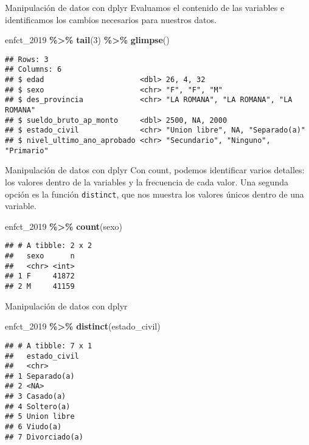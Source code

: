 \documentclass[
  ignorenonframetext,
]{beamer}
\newenvironment{Shaded}{\begin{snugshade}}{\end{snugshade}}
\newcommand{\DecValTok}[1]{\textcolor[rgb]{0.00,0.00,0.81}{#1}}
\newcommand{\FunctionTok}[1]{\textcolor[rgb]{0.13,0.29,0.53}{\textbf{#1}}}
\newcommand{\NormalTok}[1]{#1}
\newcommand{\SpecialCharTok}[1]{\textcolor[rgb]{0.81,0.36,0.00}{\textbf{#1}}}
\begin{document}
\begin{frame}[fragile]{Manipulación de datos con dplyr}
\label{manipulaciuxf3n-de-datos-con-dplyr-4}
Evaluamos el contenido de las variables e identificamos los cambios
necesarios para nuestros datos.

\begin{Shaded}
\begin{Highlighting}[]
\NormalTok{enfct\_2019 }\SpecialCharTok{\%\textgreater{}\%}
  \FunctionTok{tail}\NormalTok{(}\DecValTok{3}\NormalTok{) }\SpecialCharTok{\%\textgreater{}\%}
  \FunctionTok{glimpse}\NormalTok{()}
\end{Highlighting}
\end{Shaded}

\begin{verbatim}
## Rows: 3
## Columns: 6
## $ edad                      <dbl> 26, 4, 32
## $ sexo                      <chr> "F", "F", "M"
## $ des_provincia             <chr> "LA ROMANA", "LA ROMANA", "LA ROMANA"
## $ sueldo_bruto_ap_monto     <dbl> 2500, NA, 2000
## $ estado_civil              <chr> "Union libre", NA, "Separado(a)"
## $ nivel_ultimo_ano_aprobado <chr> "Secundario", "Ninguno", "Primario"
\end{verbatim}
\end{frame}

\begin{frame}[fragile]{Manipulación de datos con dplyr}
\label{manipulaciuxf3n-de-datos-con-dplyr-5}
Con count, podemos identificar varios detalles: los valores dentro de la
variables y la frecuencia de cada valor. Una segunda opción es la
función \texttt{distinct}, que nos muestra los valores únicos dentro de
una variable.

\begin{Shaded}
\begin{Highlighting}[]
\NormalTok{enfct\_2019 }\SpecialCharTok{\%\textgreater{}\%}
  \FunctionTok{count}\NormalTok{(sexo)}
\end{Highlighting}
\end{Shaded}

\begin{verbatim}
## # A tibble: 2 x 2
##   sexo      n
##   <chr> <int>
## 1 F     41872
## 2 M     41159
\end{verbatim}
\end{frame}

\begin{frame}[fragile]{Manipulación de datos con dplyr}
\label{manipulaciuxf3n-de-datos-con-dplyr-6}
\begin{Shaded}
\begin{Highlighting}[]
\NormalTok{enfct\_2019 }\SpecialCharTok{\%\textgreater{}\%}
  \FunctionTok{distinct}\NormalTok{(estado\_civil)}
\end{Highlighting}
\end{Shaded}

\begin{verbatim}
## # A tibble: 7 x 1
##   estado_civil 
##   <chr>        
## 1 Separado(a)  
## 2 <NA>         
## 3 Casado(a)    
## 4 Soltero(a)   
## 5 Union libre  
## 6 Viudo(a)     
## 7 Divorciado(a)
\end{verbatim}
\end{frame}
\end{document}
